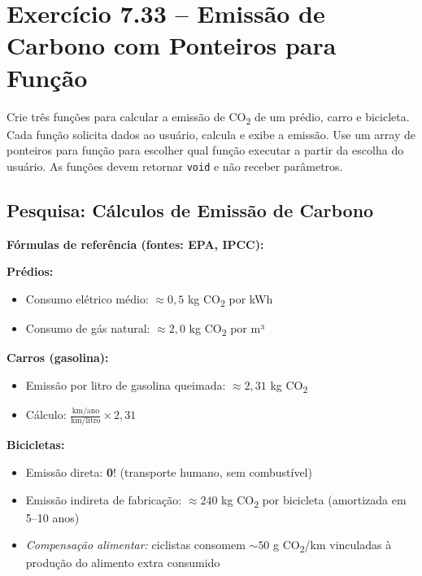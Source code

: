 \documentclass[12pt,a4paper]{article}
\begin{document}
\newpage

\section{Exercício 7.33 -- Emissão de Carbono com Ponteiros para Função}

\begin{enunciadoBox}[Enunciado 7.33]
Crie três funções para calcular a emissão de CO\textsubscript{2} de um prédio, carro e
bicicleta. Cada função solicita dados ao usuário, calcula e exibe a emissão.
Use um array de ponteiros para função para escolher qual função executar a partir
da escolha do usuário. As funções devem retornar \texttt{void} e não receber parâmetros.
\end{enunciadoBox}

\subsection*{Pesquisa: Cálculos de Emissão de Carbono}

\begin{pesquisa}
\textbf{Fórmulas de referência (fontes: EPA, IPCC):}

\textbf{Prédios:}
\begin{itemize}[noitemsep]
  \item Consumo elétrico médio: $\approx 0{,}5$ kg CO\textsubscript{2} por kWh
  \item Consumo de gás natural: $\approx 2{,}0$ kg CO\textsubscript{2} por m³
\end{itemize}

\textbf{Carros (gasolina):}
\begin{itemize}[noitemsep]
  \item Emissão por litro de gasolina queimada: $\approx 2{,}31$ kg CO\textsubscript{2}
  \item Cálculo: $\frac{\text{km/ano}}{\text{km/litro}} \times 2{,}31$
\end{itemize}

\textbf{Bicicletas:}
\begin{itemize}[noitemsep]
  \item Emissão direta: \textbf{0}! (transporte humano, sem combustível)
  \item Emissão indireta de fabricação: $\approx 240$ kg CO\textsubscript{2} por bicicleta
  (amortizada em 5--10 anos)
  \item \textit{Compensação alimentar:} ciclistas consomem $\sim 50$ g CO\textsubscript{2}/km
  vinculadas à produção do alimento extra consumido
\end{itemize}
\end{pesquisa}
\end{document}
